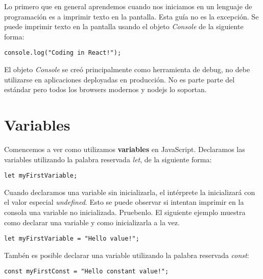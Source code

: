 \documentclass[a4paper, oneside, titlepage, 12pt]{book}
\begin{document}
Lo primero que en general aprendemos cuando nos iniciamos en un lenguaje de programación es a imprimir texto en la pantalla. Esta guía no es la excepción. Se puede imprimir texto en la pantalla usando el objeto \textit{Console} de la siguiente forma:

\begin{verbatim}
console.log("Coding in React!");
\end{verbatim}

El objeto \textit{Console} se creó principalmente como herramienta de debug, no debe utilizarse en aplicaciones deployadas en producción. No es parte parte del estándar pero todos los browsers modernos y nodejs lo soportan.
\newline

\section{Variables}

Comencemos a ver como utilizamos \textbf{variables} en JavaScript. Declaramos las variables utilizando la palabra reservada \textit{let}, de la siguiente forma:

\begin{verbatim}
let myFirstVariable;
\end{verbatim}

Cuando declaramos una variable sin inicializarla, el intérprete la inicializará con el valor especial \textit{undefined}. Esto se puede observar si intentan imprimir en la consola una variable no inicializada. Pruebenlo. El siguiente ejemplo muestra como declarar una variable y como inicializarla a la vez.

\begin{verbatim}
let myFirstVariable = "Hello value!";
\end{verbatim}

Tambén es posible declarar una variable utilizando la palabra reservada \textit{const}:

\begin{verbatim}
const myFirstConst = "Hello constant value!";
\end{verbatim}
\end{document}
